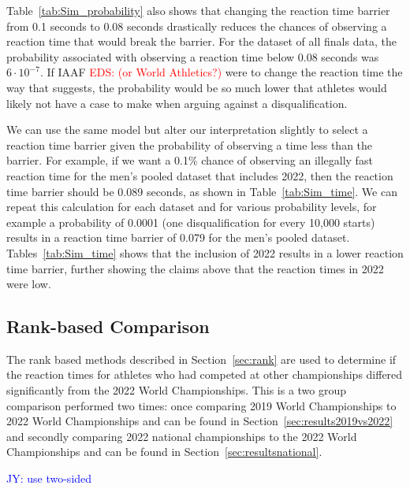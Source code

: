 \documentclass[12pt, letterpaper, titlepage]{article}
\newcommand{\jy}[1]{\textcolor{blue}{JY: #1}}
\newcommand{\eds}[1]{\textcolor{red}{EDS: (#1)}}
\begin{document}
Table~\ref{tab:Sim_probability} also shows that changing the reaction time 
barrier from 0.1 seconds to 0.08 seconds drastically reduces the chances of 
observing a reaction time that would break the barrier.  For the dataset of all 
finals data, the probability
associated with observing a reaction time below 0.08 seconds was $6\cdot10^{-7}$.
If IAAF \eds{or World Athletics?} were to change the reaction time the way that 
\citet{komi2009iaaf}
suggests, the probability would be so much lower that athletes would likely not
have a case to make when arguing against a disqualification.


We can use the same model but alter our interpretation slightly to select a 
reaction time barrier given the probability of observing a time less than the 
barrier.  For example, if we want a 0.1\% chance of observing an illegally fast 
reaction time for the men's pooled dataset that includes 2022, then the reaction
time barrier should be 0.089 seconds, as shown in Table~\ref{tab:Sim_time}.  We
can repeat this calculation for each dataset and for various probability levels,
for example a probability of 0.0001 (one disqualification for every 10,000 starts)
results in a reaction time barrier of 0.079 for the men's pooled dataset.  
Tables~\ref{tab:Sim_time} shows that the inclusion of 2022 results in a lower
reaction time barrier, further showing the claims above that the reaction times
in 2022 were low.




\subsection{Rank-based Comparison} \label{subsec:Results_Rank}

The rank based methods described in Section~\ref{sec:rank} are used
to determine if the reaction times for athletes who had competed at other 
championships differed significantly from the 2022 World Championships.  This is
a two group comparison performed two times: once comparing 2019 World
Championships to 2022 World Championships and can be found in 
Section~\ref{sec:results2019vs2022} and secondly comparing 2022 national
championships to the 2022 World Championships and can be found in
Section~\ref{sec:resultsnational}.

\jy{use two-sided}
\end{document}
